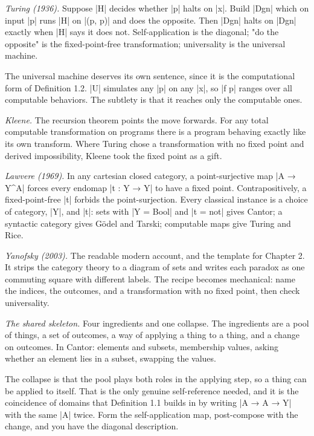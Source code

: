 \documentclass{memoir}
\begin{document}
\emph{Turing (1936).} Suppose \LeanVerb|H| decides whether \LeanVerb|p| halts on \LeanVerb|x|. Build \LeanVerb|Dgn| which
on input \LeanVerb|p| runs \LeanVerb|H| on \LeanVerb|(p, p)| and does the opposite. Then \LeanVerb|Dgn| halts on
\LeanVerb|Dgn| exactly when \LeanVerb|H| says it does not. Self-application is the diagonal; "do
the opposite" is the fixed-point-free transformation; universality is the
universal machine.

The universal machine deserves its own sentence, since it is the computational
form of Definition 1.2. \LeanVerb|U| simulates any \LeanVerb|p| on any \LeanVerb|x|, so \LeanVerb|f p| ranges over
all computable behaviors. The subtlety is that it reaches only the computable
ones.

\emph{Kleene.} The recursion theorem points the move forwards. For any total
computable transformation on programs there is a program behaving exactly like
its own transform. Where Turing chose a transformation with no fixed point and
derived impossibility, Kleene took the fixed point as a gift.

\emph{Lawvere (1969).} In any cartesian closed category, a point-surjective map \LeanVerb|A → Y^A|
forces every endomap \LeanVerb|t : Y → Y| to have a fixed point. Contrapositively, a
fixed-point-free \LeanVerb|t| forbids the point-surjection. Every classical instance is a
choice of category, \LeanVerb|Y|, and \LeanVerb|t|: sets with \LeanVerb|Y = Bool| and \LeanVerb|t = not| gives
Cantor; a syntactic category gives Gödel and Tarski; computable maps give Turing
and Rice.

\emph{Yanofsky (2003).} The readable modern account, and the template for Chapter 2.
It strips the category theory to a diagram of sets and writes each paradox as
one commuting square with different labels. The recipe becomes mechanical: name
the indices, the outcomes, and a transformation with no fixed point, then check
universality.

\emph{The shared skeleton.} Four ingredients and one collapse. The ingredients are a
pool of things, a set of outcomes, a way of applying a thing to a thing, and a
change on outcomes. In Cantor: elements and subsets, membership values, asking
whether an element lies in a subset, swapping the values.

The collapse is that the pool plays both roles in the applying step, so a thing
can be applied to itself. That is the only genuine self-reference needed, and it
is the coincidence of domains that Definition 1.1 builds in by writing \LeanVerb|A → A → Y|
with the same \LeanVerb|A| twice. Form the self-application map, post-compose with the
change, and you have the diagonal description.
\end{document}
